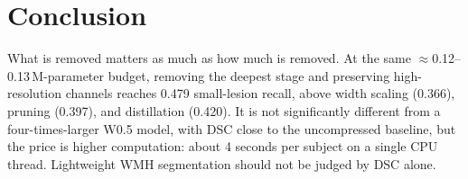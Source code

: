 \documentclass[conference]{IEEEtran}
\begin{document}
\section{Conclusion}

What is removed matters as much as how much is removed. At the same
$\approx$0.12--0.13\,M-parameter budget, removing the deepest stage and preserving
high-resolution channels reaches 0.479 small-lesion recall, above width
scaling (0.366), pruning (0.397), and distillation (0.420). It is not
significantly different from a four-times-larger W0.5 model, with DSC close to
the uncompressed baseline, but the price is higher computation: about 4 seconds
per subject on a single CPU thread. Lightweight WMH segmentation should not be judged by
DSC alone.



\end{document}
